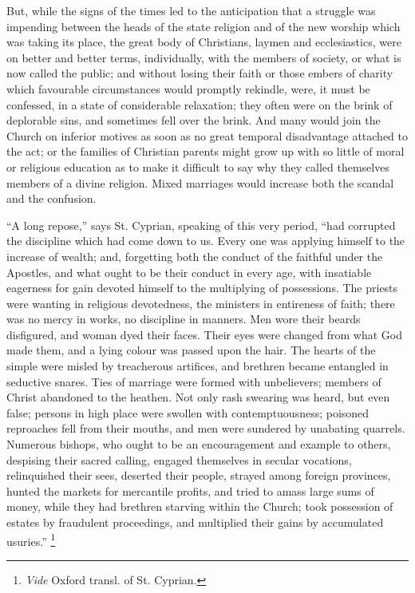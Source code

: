But, while the signs of the times led to the anticipation that a
struggle was impending between the heads of the state religion and of
the new worship which was taking its place, the great body of
Christians, laymen and ecclesiastics, were on better and better terms,
individually, with the members of society, or what is now called the
public; and without losing their faith or those embers of charity
which favourable circumstances would promptly rekindle, were, it must
be confessed, in a state of considerable relaxation; they often were
on the brink of deplorable sins, and sometimes fell over the brink.
And many would join the Church on inferior motives as soon as no
great temporal disadvantage attached to the act; or the families of
Christian parents might grow up with so little of moral or religious
education as to make it difficult to say why they called themselves
members of a divine religion. Mixed marriages would increase both the
scandal and the confusion.

``A long repose,'' says St. Cyprian, speaking of this very
period, ``had corrupted the discipline which had come down to us.
Every one was applying himself to the increase of wealth; and,
forgetting both the conduct of the faithful under the Apostles, and
what ought to be their conduct in every age, with insatiable eagerness
for gain devoted himself to the multiplying of possessions. The
priests were wanting in religious devotedness, the ministers in
entireness of faith; there was no mercy in works, no discipline in
manners. Men wore their beards disfigured, and woman dyed their faces.
Their eyes were changed from what God made them, and a lying colour
was passed upon the hair. The hearts of the simple were misled by
treacherous artifices, and brethren became entangled in seductive
snares. Ties of marriage were formed with unbelievers; members of
Christ abandoned to the heathen. Not only rash swearing was heard, but
even false; persons in high place were swollen with contemptuousness;
poisoned reproaches fell from their mouths, and men were sundered by
unabating quarrels. Numerous bishops, who ought to be an encouragement
and example to others, despising their sacred calling, engaged
themselves in secular vocations, relinquished their sees,
deserted their people, strayed among foreign provinces, hunted the
markets for mercantile profits, and tried to amass large sums of
money, while they had brethren starving within the Church; took
possession of estates by fraudulent proceedings, and multiplied their
gains by accumulated usuries.'' \footnote{\emph{Vide} Oxford transl. of St. Cyprian.}

